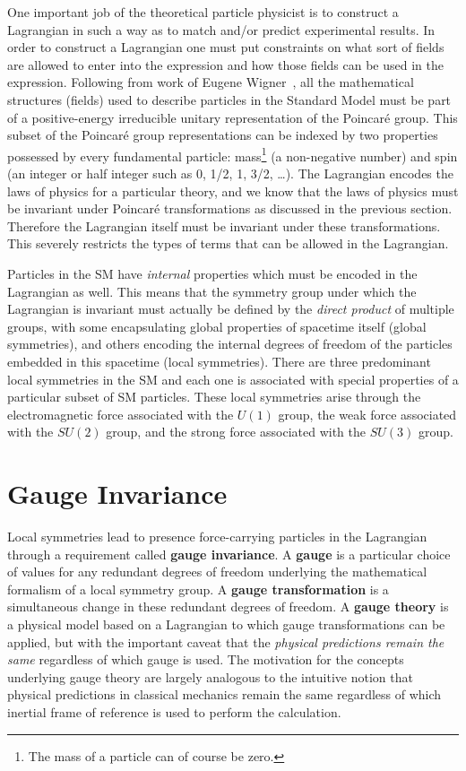 One important job of the theoretical particle physicist is to construct a Lagrangian in such a way as to match and/or predict experimental results.
In order to construct a Lagrangian one must put constraints on what sort of fields are allowed to enter into the expression and how those fields can be used in the expression.
Following from work of Eugene Wigner~\cite{Bargmann:1948ck}, all the mathematical structures (fields) used to describe particles in the Standard Model must be part of a positive-energy irreducible unitary representation of the Poincar\'{e} group.
This subset of the Poincar\'{e} group representations can be indexed by two properties possessed by every fundamental particle: mass\footnote{The mass of a particle can of course be zero.} (a non-negative number) and spin (an integer or half integer such as 0, 1/2, 1, 3/2, \dots).
The Lagrangian encodes the laws of physics for a particular theory, and we know that the laws of physics must be invariant under Poincar\'{e} transformations as discussed in the previous section.
Therefore the Lagrangian itself must be invariant under these transformations.
This severely restricts the types of terms that can be allowed in the Lagrangian.

Particles in the SM have \textit{internal} properties which must be encoded in the Lagrangian as well.
This means that the symmetry group under which the Lagrangian is invariant must actually be defined by the \textit{direct product} of multiple groups, with some encapsulating global properties of spacetime itself (global symmetries), and others encoding the internal degrees of freedom of the particles embedded in this spacetime (local symmetries).
There are three predominant local symmetries in the SM and each one is associated with special properties of a particular subset of SM particles.
These local symmetries arise through the electromagnetic force associated with the $U(1)$ group, the weak force associated with the $SU(2)$ group, and the strong force associated with the $SU(3)$ group.

\section{Gauge Invariance}
Local symmetries lead to presence force-carrying particles in the Lagrangian through a requirement called \textbf{gauge invariance}.
A \textbf{gauge} is a particular choice of values for any redundant degrees of freedom underlying the mathematical formalism of a local symmetry group.
A \textbf{gauge transformation} is a simultaneous change in these redundant degrees of freedom.
A \textbf{gauge theory} is a physical model based on a Lagrangian to which gauge transformations can be applied, but with the important caveat that the \textit{physical predictions remain the same} regardless of which gauge is used.
The motivation for the concepts underlying gauge theory are largely analogous to the intuitive notion that physical predictions in classical mechanics remain the same regardless of which inertial frame of reference is used to perform the calculation.

